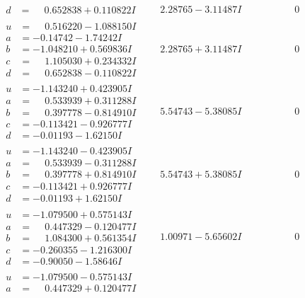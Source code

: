 \documentclass[1p]{elsarticle_modified}
\theoremstyle{definition}
\begin{document}
$$\begin{array}{c|c|c}
\begin{aligned}
d &= \phantom{-}0.652838 + 0.110822 I\end{aligned}
 & \phantom{-}2.28765 - 3.11487 I & \phantom{-0.000000 } 0 \\ \hline\begin{aligned}
u &= \phantom{-}0.516220 - 1.088150 I \\
a &= -0.14742 - 1.74242 I \\
b &= -1.048210 + 0.569836 I \\
c &= \phantom{-}1.105030 + 0.234332 I \\
d &= \phantom{-}0.652838 - 0.110822 I\end{aligned}
 & \phantom{-}2.28765 + 3.11487 I & \phantom{-0.000000 } 0 \\ \hline\begin{aligned}
u &= -1.143240 + 0.423905 I \\
a &= \phantom{-}0.533939 + 0.311288 I \\
b &= \phantom{-}0.397778 - 0.814910 I \\
c &= -0.113421 - 0.926777 I \\
d &= -0.01193 - 1.62150 I\end{aligned}
 & \phantom{-}5.54743 - 5.38085 I & \phantom{-0.000000 } 0 \\ \hline\begin{aligned}
u &= -1.143240 - 0.423905 I \\
a &= \phantom{-}0.533939 - 0.311288 I \\
b &= \phantom{-}0.397778 + 0.814910 I \\
c &= -0.113421 + 0.926777 I \\
d &= -0.01193 + 1.62150 I\end{aligned}
 & \phantom{-}5.54743 + 5.38085 I & \phantom{-0.000000 } 0 \\ \hline\begin{aligned}
u &= -1.079500 + 0.575143 I \\
a &= \phantom{-}0.447329 - 0.120477 I \\
b &= \phantom{-}1.084300 + 0.561354 I \\
c &= -0.260355 - 1.216300 I \\
d &= -0.90050 - 1.58646 I\end{aligned}
 & \phantom{-}1.00971 - 5.65602 I & \phantom{-0.000000 } 0 \\ \hline\begin{aligned}
u &= -1.079500 - 0.575143 I \\
a &= \phantom{-}0.447329 + 0.120477 I \\

\end{aligned}
\end{array}$$
\end{document}
